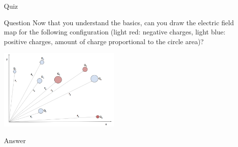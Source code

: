 {
\problemslide

\begin{frame}{Quiz}

\begin{blockexmplque}{Question}
   Now that you understand the basics, can you draw the electric field map for the following configuration
   (light red: negative charges, light blue: positive charges, amount of charge proportional to the circle area)?
   \vspace{0.3cm}
   \begin{center}
     \includegraphics[width=0.45\textwidth]{./images/problems/lect01_n_charges.png}\\
   \end{center}
\end{blockexmplque}

\begin{blockexmplans}{Answer}
\noindent
\end{blockexmplans}

\end{frame}

} %


%
%

